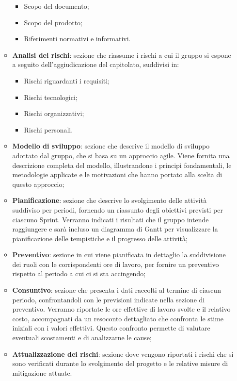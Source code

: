 \begin{itemize}
\begin{itemize}
                    \begin{itemize}
                        \item Scopo del documento;
                        \item Scopo del prodotto;
                        \item Riferimenti normativi e informativi.
                    \end{itemize}
              \item \textbf{Analisi dei rischi}: sezione che riassume i rischi a cui il gruppo si espone a seguito dell'aggiudicazione del capitolato, suddivisi in:
                    \begin{itemize}
                        \item Rischi riguardanti i requisiti;
                        \item Rischi tecnologici;
                        \item Rischi organizzativi;
                        \item Rischi personali.
                    \end{itemize}
              \item \textbf{Modello di sviluppo}: sezione che descrive il modello di sviluppo adottato dal gruppo, che si basa su un approccio agile. Viene fornita una descrizione completa del modello, illustrandone i principi fondamentali, le metodologie applicate e le motivazioni che hanno portato alla scelta di questo approccio;
              \item \textbf{Pianificazione}: sezione che descrive lo svolgimento delle attività suddiviso per periodi, fornendo un riassunto degli obiettivi previsti per ciascuno Sprint. Verranno indicati i risultati che il gruppo intende raggiungere e sarà incluso un diagramma di Gantt per visualizzare la pianificazione delle tempistiche e il progresso delle attività;
              \item \textbf{Preventivo}: sezione in cui viene pianificata in dettaglio la suddivisione dei ruoli con le corrispondenti ore di lavoro, per fornire un preventivo rispetto al periodo a cui ci si sta accingendo;
              \item \textbf{Consuntivo}: sezione che presenta i dati raccolti al termine di ciascun periodo, confrontandoli con le previsioni indicate nella sezione di preventivo. Verranno riportate le ore effettive di lavoro svolte e il relativo costo, accompagnati da un resoconto dettagliato che confronta le stime iniziali con i valori effettivi. Questo confronto permette di valutare eventuali scostamenti e di analizzarne le cause;
              \item \textbf{Attualizzazione dei rischi}: sezione dove vengono riportati i rischi che si sono verificati durante lo svolgimento del progetto e le relative misure di mitigazione attuate.
          \end{itemize}


\end{itemize}
